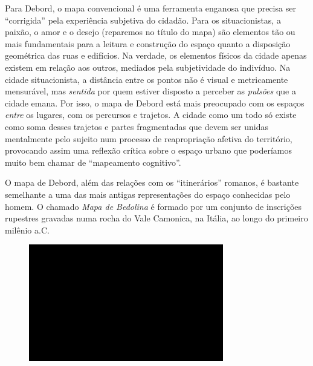 Para Debord, o mapa convencional é uma ferramenta enganosa que precisa
ser ``corrigida'' pela experiência subjetiva do cidadão. Para os
situacionistas, a paixão, o amor e o desejo (reparemos no título do
mapa) são elementos tão ou mais fundamentais para a leitura e construção
do espaço quanto a disposição geométrica das ruas e edifícios. Na
verdade, os elementos físicos da cidade apenas existem em relação aos
outros, mediados pela subjetividade do indivíduo. Na cidade
situacionista, a distância entre os pontos não é visual e metricamente
mensurável, mas \emph{sentida} por quem estiver disposto a perceber as
\emph{pulsões} que a cidade emana. Por isso, o mapa de Debord está mais
preocupado com os espaços \emph{entre} os lugares, com os percursos e
trajetos. A cidade como um todo só existe como soma desses trajetos e
partes fragmentadas que devem ser unidas mentalmente pelo sujeito num
processo de reapropriação afetiva do território, provocando assim uma
reflexão crítica sobre o espaço urbano que poderíamos muito bem chamar
de ``mapeamento cognitivo''.

O mapa de Debord, além das relações com os ``itinerários'' romanos, é
bastante semelhante a uma das mais antigas representações do espaço conhecidas pelo
homem. O chamado \emph{Mapa de Bedolina} é formado por um conjunto de
inscrições rupestres gravadas numa rocha do Vale Camonica, na Itália, ao
longo do primeiro milênio a.C.

\begin{figure}[!ht]

\centering
 \includegraphics[width=85mm]{./imgs/im1.jpg}
\caption{\tiny{}}

\end{figure}

